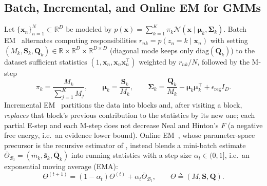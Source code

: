 \documentclass[10pt]{article} %
\newcommand{\R}{\mathbb{R}}
\newcommand{\diag}{\mathrm{diag}}
\begin{document}
\subsection{Batch, Incremental, and Online EM for GMMs}
Let $\{\mathbf{x}_n\}_{n=1}^N \subset \R^D$ be modeled by $p(\mathbf{x}) = \sum_{k=1}^K \pi_k \mathcal{N}(\mathbf{x} \mid \boldsymbol{\mu}_k, \boldsymbol{\Sigma}_k)$. Batch EM~\citep{dempster1977em} alternates computing responsibilities $r_{nk} = p(z_n = k \mid \mathbf{x}_n)$ with setting $(M_k, \mathbf{S}_k, \mathbf{Q}_k) \in \R \times \R^D \times \R^{D \times D}$ (diagonal mode keeps only $\diag(\mathbf{Q}_k)$) to the dataset sufficient statistics $(1, \mathbf{x}_n, \mathbf{x}_n\mathbf{x}_n^\top)$ weighted by $r_{nk}/N$, followed by the M-step
\begin{equation}
\pi_k = \frac{M_k}{\sum_{j=1}^K M_j}, \qquad
\boldsymbol{\mu}_k = \frac{\mathbf{S}_k}{M_k}, \qquad
\boldsymbol{\Sigma}_k = \frac{\mathbf{Q}_k}{M_k} - \boldsymbol{\mu}_k \boldsymbol{\mu}_k^\top + \epsilon_{\mathrm{reg}} I_D.
\label{eq:mstep}
\end{equation}
Incremental EM~\citep{neal1998view} partitions the data into blocks and, after visiting a block, \emph{replaces} that block's previous contribution to the statistics by its new one; each partial E-step and each M-step does not decrease Neal and Hinton's $F$ (a negative free energy, i.e.\ an evidence lower bound). Online EM~\citep{sato2000online,cappe2009online,liang2009online}, whose parameter-space precursor is the recursive estimator of \citet{titterington1984recursive}, instead blends a mini-batch estimate $\bar{\Theta}_{\mathcal{B}_t} = (\bar{m}_k, \bar{\mathbf{s}}_k, \bar{\mathbf{Q}}_k)$ into running statistics with a step size $\alpha_t \in (0, 1]$, i.e.\ an exponential moving average (EMA):
\begin{equation}
\Theta^{(t+1)} = (1 - \alpha_t)\Theta^{(t)} + \alpha_t \bar{\Theta}_{\mathcal{B}_t}, \qquad \Theta \triangleq (M, \mathbf{S}, \mathbf{Q}).
\label{eq:ema_update}
\end{equation}
\end{document}

